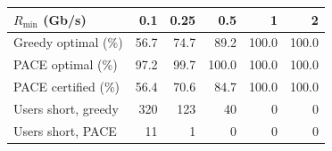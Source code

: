 \begin{tabular}{@{}lrrrrr@{}}
\toprule
$R_{\min}$ (Gb/s) & 0.1 & 0.25 & 0.5 & 1 & 2 \\
\midrule
Greedy optimal (\%) & 56.7 & 74.7 & 89.2 & 100.0 & 100.0 \\
PACE optimal (\%) & 97.2 & 99.7 & 100.0 & 100.0 & 100.0 \\
PACE certified (\%) & 56.4 & 70.6 & 84.7 & 100.0 & 100.0 \\
Users short, greedy & 320 & 123 & 40 & 0 & 0 \\
Users short, PACE & 11 & 1 & 0 & 0 & 0 \\
\bottomrule
\end{tabular}
